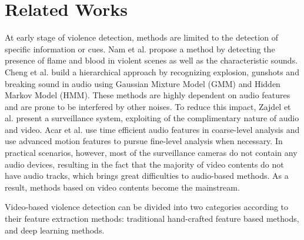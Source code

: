 \documentclass[10pt,twocolumn,letterpaper]{article}
\begin{document}

\section{Related Works}

At early stage of violence detection, methods are limited to the detection of specific information or cues. 
Nam et al. \cite{nam1998audio} propose a method by detecting the presence of flame and blood in violent scenes as well as the characteristic sounds. 
Cheng et al. \cite{cheng2003semantic} build a  hierarchical approach by recognizing explosion, gunshots and breaking sound in audio using Gaussian Mixture Model (GMM) and Hidden Markov Model (HMM). 
These methods are highly dependent on audio features and are prone to be interfered by other noises. 
To reduce this impact, Zajdel et al. \cite{zajdel2007cassandra} present a surveillance system, exploiting of the complimentary nature of audio and video.
Acar et al. \cite{acar2016breaking} use time efficient audio features in coarse-level analysis and use advanced motion features to pursue fine-level analysis when necessary.
In practical scenarios, however, most of the surveillance cameras do not contain any audio devices, resulting in the fact that  the majority of video contents do not have audio tracks, which brings great difficulties to audio-based methods. 
As a result, methods based on video contents become the mainstream. 

Video-based violence detection can be divided into two categories according to their feature extraction methods:
traditional hand-crafted feature based methods, and deep learning methods.
\end{document}
